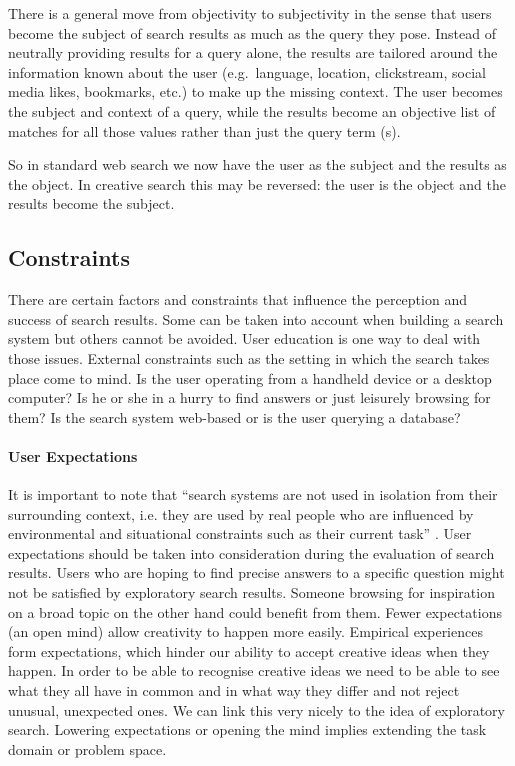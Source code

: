 There is a general move from objectivity to subjectivity in the sense that users become the subject of search results as much as the query they pose. Instead of neutrally providing results for a query alone, the results are tailored around the information known about the user (e.g.\ language, location, clickstream, social media likes, bookmarks, etc.) to make up the missing context. The user becomes the subject and context of a query, while the results become an objective list of matches for all those values rather than just the query term (s).

So in standard web search we now have the user as the subject and the results as the object. In creative search this may be reversed: the user is the object and the results become the subject.


\subsection{Constraints}

There are certain factors and constraints that influence the perception and success of search results. Some can be taken into account when building a search system but others cannot be avoided. User education is one way to deal with those issues. External constraints such as the setting in which the search takes place come to mind. Is the user operating from a handheld device or a desktop computer? Is he or she in a hurry to find answers or just leisurely browsing for them? Is the search system web-based or is the user querying a database?

\paragraph{User Expectations} It is important to note that ``search systems are not used in isolation from their surrounding context, i.e. they are used by real people who are influenced by environmental and situational constraints such as their current task'' \autocite{White2004}. User expectations should be taken into consideration during the evaluation of search results. Users who are hoping to find precise answers to a specific question might not be satisfied by exploratory search results. Someone browsing for inspiration on a broad topic on the other hand could benefit from them. Fewer expectations (an open mind) allow creativity to happen more easily. Empirical experiences form expectations, which hinder our ability to accept creative ideas when they happen. In order to be able to recognise creative ideas we need to be able to see what they all have in common and in what way they differ and not reject unusual, unexpected ones. We can link this very nicely to the idea of exploratory search. Lowering expectations or opening the mind implies extending the task domain or problem space. 

